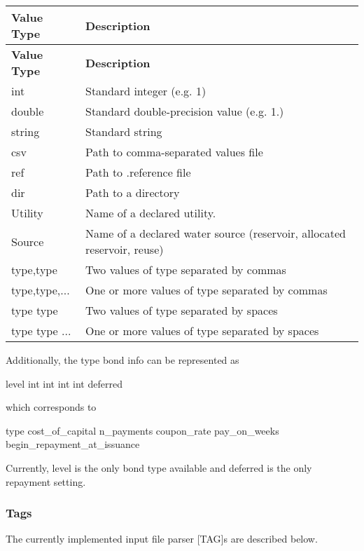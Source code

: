 \tabulinesep=1mm
\begin{longtabu} spread 0pt [c]{*{2}{|X[-1]}|}
\hline
\rowcolor{\tableheadbgcolor}\textbf{ Value Type  }&\textbf{ Description   }\\
\endfirsthead
\hline
\endfoot
\hline
\rowcolor{\tableheadbgcolor}\textbf{ Value Type  }&\textbf{ Description   }\\
\endhead
int  &Standard integer (e.\+g. 1)   \\
double  &Standard double-\/precision value (e.\+g. 1.)   \\
string  &Standard string   \\
csv  &Path to comma-\/separated values file   \\
ref  &Path to .reference file   \\
dir  &Path to a directory   \\
Utility  &Name of a declared utility.   \\
Source  &Name of a declared water source (reservoir, allocated reservoir, reuse)   \\
type,type  &Two values of type separated by commas   \\
type,type,...  &One or more values of type separated by commas   \\
type type  &Two values of type separated by spaces   \\
type type ...  &One or more values of type separated by spaces   \\
\end{longtabu}


Additionally, the type {\ttfamily bond info} can be represented as 
\begin{DoxyCode}
level int int int int deferred
\end{DoxyCode}
 which corresponds to 
\begin{DoxyCode}
type cost\_of\_capital n\_payments coupon\_rate pay\_on\_weeks begin\_repayment\_at\_issuance
\end{DoxyCode}
 Currently, {\ttfamily level} is the only bond type available and {\ttfamily deferred} is the only repayment setting.

\subsubsection*{Tags}

The currently implemented input file parser \mbox{[}T\+AG\mbox{]}s are described below.

